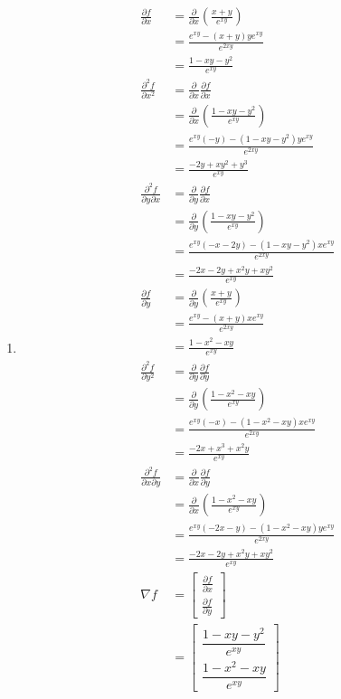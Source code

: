 \begin{enumerate}
 \item
  \begin{align*}
   \frac{\partial f}{\partial x}
   &= \frac{\partial}{\partial x}(\frac{x+y}{e^{xy}}) \\
   &= \frac{e^{xy} - (x+y)ye^{xy}}{e^{2xy}} \\
   &= \frac{1 - xy - y^2}{e^{xy}} \\
   \frac{\partial^2 f}{\partial x^2}
   &= \frac{\partial}{\partial x}\frac{\partial f}{\partial x} \\
   &= \frac{\partial}{\partial x}(\frac{1 - xy - y^2}{e^{xy}}) \\
   &= \frac{e^{xy}(-y) - (1 - xy - y^2)ye^{xy}}{e^{2xy}} \\
   &= \frac{-2y + xy^2 + y^3}{e^{xy}} \\
   \frac{\partial^2 f}{\partial y \partial x}
   &= \frac{\partial}{\partial y}\frac{\partial f}{\partial x} \\
   &= \frac{\partial}{\partial y}(\frac{1 - xy - y^2}{e^{xy}}) \\
   &= \frac{e^{xy}(-x - 2y) - (1 - xy - y^2)xe^{xy}}{e^{2xy}} \\
   &= \frac{-2x - 2y + x^2y + xy^2}{e^{xy}} \\
   \frac{\partial f}{\partial y}
   &= \frac{\partial}{\partial y}(\frac{x+y}{e^{xy}}) \\
   &= \frac{e^{xy} - (x+y)xe^{xy}}{e^{2xy}} \\
   &= \frac{1 - x^2 - xy}{e^{xy}} \\
   \frac{\partial^2 f}{\partial y^2}
   &= \frac{\partial}{\partial y}\frac{\partial f}{\partial y} \\
   &= \frac{\partial}{\partial y}(\frac{1 - x^2 - xy}{e^{xy}}) \\
   &= \frac{e^{xy}(-x) - (1 - x^2 - xy)xe^{xy}}{e^{2xy}} \\
   &= \frac{-2x + x^3 + x^2y}{e^{xy}} \\
   \frac{\partial^2 f}{\partial x \partial y}
   &= \frac{\partial}{\partial x}\frac{\partial f}{\partial y} \\
   &= \frac{\partial}{\partial x}(\frac{1 - x^2 - xy}{e^{xy}}) \\
   &= \frac{e^{xy}(-2x - y) - (1 - x^2 - xy)ye^{xy}}{e^{2xy}} \\
   &= \frac{-2x - 2y + x^2y + xy^2}{e^{xy}} \\
   \nabla f
   &= \begin{bmatrix}
       \frac{\partial f}{\partial x} \\
       \frac{\partial f}{\partial y}
      \end{bmatrix} \\
   &= \begin{bmatrix}
       \dfrac{1 - xy - y^2}{e^{xy}} \\
       \dfrac{1 - x^2 - xy}{e^{xy}}
      \end{bmatrix}
  \end{align*}

\end{enumerate}

